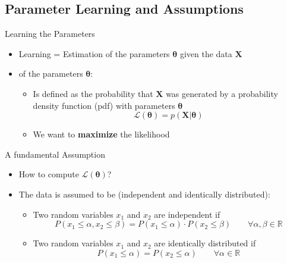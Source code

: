 \subsection{Parameter Learning and Assumptions}

\begin{frame}{Learning the Parameters}{}
	\begin{itemize}
		\item Learning = Estimation of the parameters $\bm{\theta}$ given the data $\bm{X}$
		\item {} of the parameters $\bm{\theta}$:
		\begin{itemize}
			\item Is defined as the probability that $\bm{X}$ was generated by a
				probability density function (pdf) with parameters $\bm{\theta}$
			\begin{equation}
				\mathcal{L}(\bm{\theta}) = p(\bm{X} \vert \bm{\theta})
			\end{equation}
			\item We want to \textbf{maximize} the likelihood
		\end{itemize}
	\end{itemize}
	
	\begin{boxBlueNoFrame}
	\end{boxBlueNoFrame}
\end{frame}


\begin{frame}{A fundamental Assumption}{}
	\begin{itemize}
		\item How to compute $\mathcal{L}(\bm{\theta})$?
		\item The data is assumed to be  (independent and identically distributed):
		\begin{itemize}
			\item Two random variables $x_1$ and $x_2$ are independent if
			\begin{equation}
				P(x_1 \le \alpha, x_2 \le \beta) = P(x_1 \le \alpha) \cdot P(x_2 \le \beta) \qquad \forall \alpha, \beta \in \mathbb{R}
			\end{equation}
			\item Two random variables $x_1$ and $x_2$ are identically distributed if
			\begin{equation}
				P(x_1 \le \alpha) = P(x_2 \le \alpha) \qquad \forall \alpha \in \mathbb{R}
			\end{equation}
		\end{itemize}
	\end{itemize}
\end{frame}


